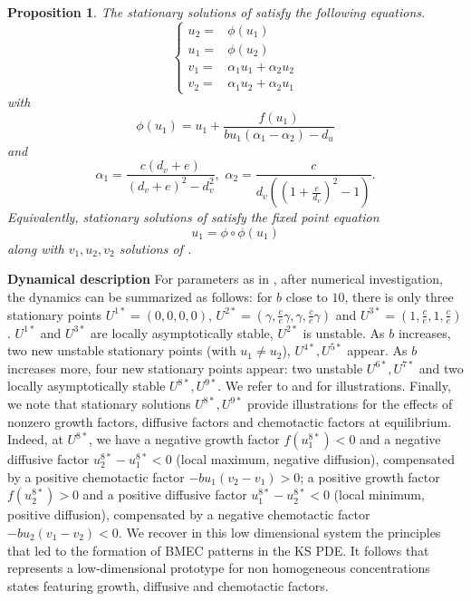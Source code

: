\documentclass[final,1p,times]{elsarticle}
\newtheorem{prop}[thm]{Proposition}
\begin{document}
\begin{prop}
 The stationary solutions of  satisfy the following equations. 
\begin{equation}
\label{eq:sta2times2}   
\left\{\begin{array}{rl}
     u_2=&\phi(u_1) \\
    u_1=&\phi(u_2) \\
    v_1=&\alpha_1 u_1 +\alpha_2 u_2\\
    v_2=&\alpha_1 u_2 +\alpha_2 u_1
\end{array}\right.
\end{equation}
with
\begin{equation}
\label{eq:phi}   
     \phi(u_1)=u_1+\frac{f(u_1)}{bu_1(\alpha_1-\alpha_2)-d_u}  
\end{equation}
and
\begin{equation}
\label{eq:paramalpha}   
     \alpha_1=\frac{c(d_v+e)}{(d_v+e)^2-d_v^2},  \,\,    \alpha_2=\frac{c}{d_v((1+\frac{e}{d_v})^2-1)}. 
\end{equation}
Equivalently, stationary solutions of  satisfy the fixed point equation
\begin{equation}
    \label{eq:PF}
    u_1=\phi\circ\phi(u_1)
\end{equation}
along with $v_1,u_2,v_2$ solutions of . 
\end{prop}

\textbf{Dynamical description}
For parameters as in  , after numerical investigation, the dynamics can be summarized as follows: for $b$ close to $10$, there is only three stationary points $U^{1*}=(0,0,0,0)$, $U^{2*}=(\gamma,\frac{c}{e}\gamma,\gamma,\frac{c}{e}\gamma)$ and $U^{3*}=(1,\frac{c}{e},1,\frac{c}{e})$. $U^{1*}$ and $U^{3*}$ are locally asymptotically stable, $U^{2*}$ is unstable. As $b$ increases, two new unstable stationary points (with $u_1\neq u_2$), $U^{4*},U^{5*}$ appear. As $b$ increases more, four new stationary points appear: two unstable  $U^{6*},U^{7*}$ and two locally asymptotically stable  $U^{8*},U^{9*}$. We refer to  and  for illustrations. Finally, we note that stationary solutions $U^{8*},U^{9*}$ provide illustrations for the effects of nonzero growth factors, diffusive factors and chemotactic factors at equilibrium. Indeed, at $U^{8*}$, we have a negative growth factor $f(u_1^{8*})<0$ and a negative diffusive factor $u_2^{8*}-u_1^{8*}<0$ (local maximum, negative diffusion),  compensated by a positive chemotactic factor $-bu_1(v_2-v_1)>0$; a positive growth factor $f(u_2^{8*})>0$ and a positive diffusive factor $u_1^{8*}-u_2^{8*}<0$ (local minimum, positive diffusion),  compensated by a negative chemotactic factor $-bu_2(v_1-v_2)<0$. We recover in this low dimensional system the principles that led to the formation of BMEC patterns in the KS PDE. It follows that  represents a low-dimensional  prototype for non homogeneous concentrations states featuring growth, diffusive and chemotactic factors.
\end{document}
